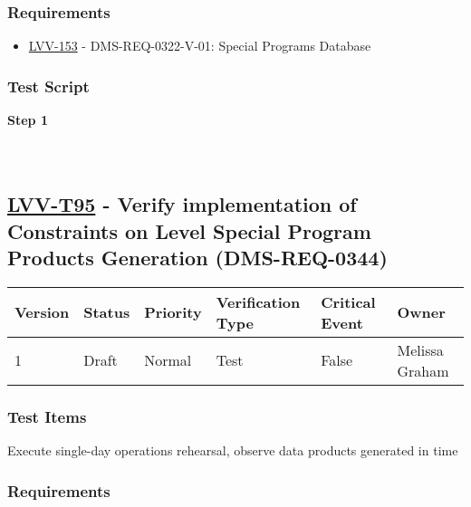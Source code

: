 \hypertarget{requirements-184}{%
\subsubsection{Requirements}\label{requirements-184}}

\begin{itemize}
\tightlist
\item
  \href{https://jira.lsstcorp.org/browse/LVV-153}{LVV-153} -
  DMS-REQ-0322-V-01: Special Programs Database
\end{itemize}

\hypertarget{test-script-184}{%
\subsubsection{Test Script}\label{test-script-184}}

\textbf{Step 1}\\
~\\
~\\

\hypertarget{lvv-t95---verify-implementation-of-constraints-on-level-special-program-products-generation-dms-req-0344}{%
\subsection{\texorpdfstring{\href{https://jira.lsstcorp.org/secure/Tests.jspa\#/testCase/LVV-T95}{LVV-T95}
- Verify implementation of Constraints on Level Special Program Products
Generation
(DMS-REQ-0344)}{LVV-T95 - Verify implementation of Constraints on Level Special Program Products Generation (DMS-REQ-0344)}}\label{lvv-t95---verify-implementation-of-constraints-on-level-special-program-products-generation-dms-req-0344}}

\begin{longtable}[]{@{}llllll@{}}
\toprule
Version & Status & Priority & Verification Type & Critical Event &
Owner\tabularnewline
\midrule
\endhead
1 & Draft & Normal & Test & False & Melissa Graham\tabularnewline
\bottomrule
\end{longtable}

\hypertarget{test-items-184}{%
\subsubsection{Test Items}\label{test-items-184}}

Execute single-day operations rehearsal, observe data products generated
in time

\hypertarget{requirements-185}{%
\subsubsection{Requirements}\label{requirements-185}}

